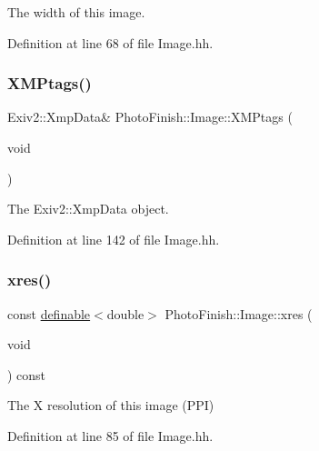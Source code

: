 The width of this image. 



Definition at line 68 of file Image.\+hh.

\mbox{\label{class_photo_finish_1_1_image_a186fec390a5f37e2d26dec2b916ad513}} 
\subsubsection{\texorpdfstring{X\+M\+Ptags()}{XMPtags()}}
{\footnotesize\ttfamily Exiv2\+::\+Xmp\+Data\& Photo\+Finish\+::\+Image\+::\+X\+M\+Ptags (\begin{DoxyParamCaption}\item[{void}]{ }\end{DoxyParamCaption})\hspace{0.3cm}{\ttfamily [inline]}}



The Exiv2\+::\+Xmp\+Data object. 



Definition at line 142 of file Image.\+hh.

\mbox{\label{class_photo_finish_1_1_image_afaca8c09e654936291f078e28c7785ac}} 
\subsubsection{\texorpdfstring{xres()}{xres()}}
{\footnotesize\ttfamily const \hyperlink{class_photo_finish_1_1definable}{definable}$<$double$>$ Photo\+Finish\+::\+Image\+::xres (\begin{DoxyParamCaption}\item[{void}]{ }\end{DoxyParamCaption}) const\hspace{0.3cm}{\ttfamily [inline]}}



The X resolution of this image (P\+PI) 



Definition at line 85 of file Image.\+hh.

\mbox{\label{class_photo_finish_1_1_image_a6f52945c791b47e598aa94a9c9643d66}} 
